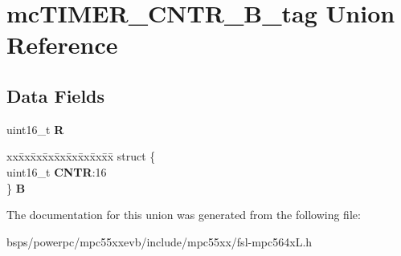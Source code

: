 \hypertarget{unionmcTIMER__CNTR__16B__tag}{}\section{mc\+T\+I\+M\+E\+R\+\_\+\+C\+N\+T\+R\+\_\+B\+\_\+tag Union Reference}
\label{unionmcTIMER__CNTR__16B__tag}
\subsection*{Data Fields}
\begin{DoxyCompactItemize}
\item 
\mbox{\label{unionmcTIMER__CNTR__16B__tag_a45f32ca37e6568d5fb525f681e7f6d2c}} 
uint16\+\_\+t {\bfseries R}
\item 
\mbox{\label{unionmcTIMER__CNTR__16B__tag_acf726ffc58ca947f57e79277484a004d}} 
\begin{tabbing}
xx\=xx\=xx\=xx\=xx\=xx\=xx\=xx\=xx\=\kill
struct \{\\
\>uint16\_t {\bfseries CNTR}:16\\
\} {\bfseries B}\\

\end{tabbing}\end{DoxyCompactItemize}


The documentation for this union was generated from the following file\+:\begin{DoxyCompactItemize}
\item 
bsps/powerpc/mpc55xxevb/include/mpc55xx/fsl-\/mpc564x\+L.\+h\end{DoxyCompactItemize}
